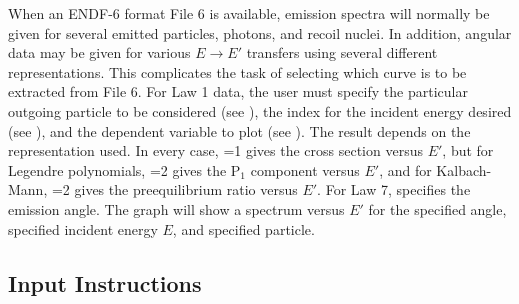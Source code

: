 When an ENDF-6 format File 6 is available, emission spectra
will normally be given for several emitted particles, photons,
and recoil nuclei.  In addition, angular data may be given for
various $E{\rightarrow}E'$ transfers using several different
representations.  This complicates the task of selecting which
curve is to be extracted from File 6.  For Law 1 data, the
user must specify the particular outgoing particle to be
considered (see ), the index for the incident energy
desired (see ), and the dependent variable to plot (see
).  The result depends on the representation used.  In
every case, =1 gives the cross section versus $E'$, but
for Legendre polynomials, =2 gives the P$_1$ component
versus $E'$, and for Kalbach-Mann, =2 gives the
preequilibrium ratio versus $E'$.  For Law 7,  specifies the
emission angle.  The graph will show a spectrum versus $E'$ for
the specified angle, specified incident energy $E$, and specified
particle.


\subsection{Input Instructions}
\label{ssPLOTR_inp}


